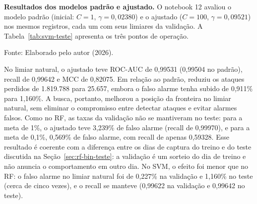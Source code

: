 \documentclass[
    12pt,                %
    openright,           %
    oneside,             %
    a4paper,             %
    english,             %
    brazil               %
]{abntex2}
\begin{document}
\textbf{Resultados dos modelos padrão e ajustado.} O notebook 12 avaliou o modelo padrão (inicial: $C = 1$, $\gamma = 0{,}02380$) e o ajustado ($C = 100$, $\gamma = 0{,}09521$) nos mesmos registros, cada um com seus limiares da validação. A Tabela~\ref{tab:svm-teste} apresenta os três pontos de operação.

\begin{table}
\centering
\caption{Comparação dos modelos SVM no teste}
\label{tab:svm-teste}
\footnotesize
{}
\par\smallskip
Fonte: Elaborado pelo autor (2026).
\end{table}

No limiar natural, o ajustado teve ROC-AUC de 0,99531 (0,99504 no padrão), recall de 0,99642 e MCC de 0,82075. Em relação ao padrão, reduziu os ataques perdidos de 1.819.788 para 25.657, embora o falso alarme tenha subido de 0,911\% para 1,160\%. A busca, portanto, melhorou a posição da fronteira no limiar natural, sem eliminar o compromisso entre detectar ataques e evitar alarmes falsos. Como no RF, as taxas da validação não se mantiveram no teste: para a meta de 1\%, o ajustado teve 3,239\% de falso alarme (recall de 0,99970), e para a meta de 0,1\%, 0,569\% de falso alarme, com recall de apenas 0,59328. Esse resultado é coerente com a diferença entre os dias de captura do treino e do teste discutida na Seção~\ref{sec:rf-bin-teste}: a validação é um sorteio do dia de treino e não anuncia o comportamento em outro dia. No SVM, o efeito foi menor que no RF: o falso alarme no limiar natural foi de 0,227\% na validação e 1,160\% no teste (cerca de cinco vezes), e o recall se manteve (0,99622 na validação e 0,99642 no teste).
\end{document}
